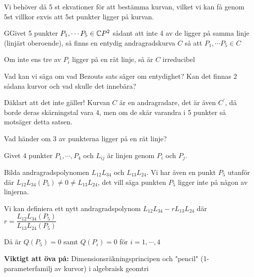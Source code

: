 \noindent Vi behöver då 5 st ekvationer för att bestämma kurvan, vilket vi kan få genom 5st villkor exvis att 5st punkter ligger på kurvan.
\par\bigskip
\begin{theo}
  GGivet 5 punkter $P_1,\cdots P_5\in\mathbb{C} P^2$ sådant att inte 4 av de ligger på samma linje (linjärt oberoende), så finns en entydig andragradskurva $C$ så att $P_1,\cdots P_5\in C$ 
  \par\bigskip
  \noindent Om inte ens tre av $P_i$ ligger på en rät linje, så är $C$ irreducibel 
\end{theo}
\par\bigskip
\noindent Vad kan vi säga om vad Bezouts sats säger om entydighet? Kan det finnas 2 sådana kurvor och vad skulle det innebära?\par
\noindent Däklart att det inte gäller! Kurvan $C$ är en andragradare, det är även $C^{\prime}$, då borde deras skärningstal vara 4, men om de skär varandra i 5 punkter så motsäger detta satsen. 
\par\bigskip
\noindent Vad händer om 3 av punkterna ligger på en rät linje?\par
\noindent Givet 4 punkter $P_1,\cdots, P_4$ och $L_{ij}$ är linjen genom $P_i$ och $P_j$.\par
\noindent Bilda andragradspolynomen $L_{12}L_{34}$  och $L_{13}L_{24}$. Vi har även en punkt $P_5$ utanför där $L_{12}L_{34}(P_5) \neq0\neq L_{13}L_{24}$, det vill säga punkten $P_5$ ligger inte på någon av linjerna.\par
\noindent Vi kan definiera ett nytt andragradspolynom $L_{12}L_{34}-rL_{13}L_{24}$ där $r  = \dfrac{L_{12}L_{34}(P_5)}{L_{13}L_{24}(P_5)}$\par
\noindent Då är $Q(P_5)=0$ samt $Q(P_i)=0$ för $i=1,\cdots,4$
\par\bigskip
\noindent\textbf{Viktigt att öva på:} Dimensionsräkningsprincipen och "pencil" (1-parameterfamilj av kurvor) i algebraisk geomtri 
